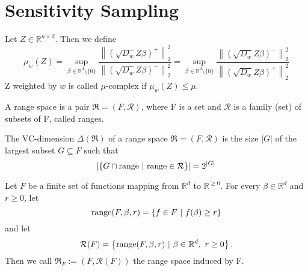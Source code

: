 \section{Sensitivity Sampling}

\begin{definition}
    Let $Z \in \mathbb{R}^{n \times d}$. Then we define
    $$
        \mu_w(Z) = \sup_{\beta \in \mathbb{R}^d \setminus \{0\}}
        \frac{\left \lVert (\sqrt{D_w} Z \beta)^+ \right \rVert_2^2}
        {\left \lVert (\sqrt{D_w} Z \beta)^- \right \rVert_2^2}
        =
        \sup_{\beta \in \mathbb{R}^d \setminus \{0\}}
        \frac{\left \lVert (\sqrt{D_w} Z \beta)^- \right \rVert_2^2}
        {\left \lVert (\sqrt{D_w} Z \beta)^+ \right \rVert_2^2}
    $$
    Z weighted by $w$ is called $\mu$-complex if $\mu_w(Z) \leq \mu$.
\end{definition}

\begin{definition}
    A range space is a pair $\mathfrak{R} = (F, \mathcal{R})$, where F is a set
    and $\mathcal{R}$ is a family (set) of subsets of F, called
    ranges.
\end{definition}

\begin{definition}
    The VC-dimension $\Delta(\mathfrak{R})$ of a range space $\mathfrak{R} = (F, \mathcal{R})$ is
    the size $|G|$ of the largest subset $G \subseteq F$ such that
    \begin{equation*}
        \left| \left\{ G \cap \textup{range} \ | \ \textup{range} \in \mathcal{R} \right\} \right|
        = 2^{|G|}
    \end{equation*}
\end{definition}

\begin{definition}
    Let $F$ be a finite set of functions mapping from $\mathbb{R}^d$ to $\mathbb{R}^{\geq 0}$.
    For every $\beta \in \mathbb{R}^d$ and $r \geq 0$, let
    \begin{equation*}
        \textup{range}(F, \beta, r) = \left\{ f \in F \ | \  f(\beta) \geq r  \right\}
    \end{equation*}
    and let
    \begin{equation*}
        \mathcal{R}(F) = \left\{ \textup{range}(F, \beta, r) \ | \ \beta \in \mathbb{R}^d, \ r \geq 0  \right\}.
    \end{equation*}
    Then we call $\mathfrak{R}_F := (F, \mathcal{R}(F))$ the range space induced by F.
\end{definition}

